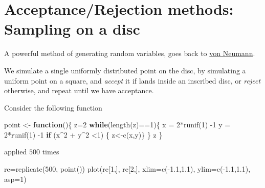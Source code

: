 \documentclass[
]{article}
\newenvironment{Shaded}{\begin{snugshade}}{\end{snugshade}}
\newcommand{\AttributeTok}[1]{\textcolor[rgb]{0.77,0.63,0.00}{#1}}
\newcommand{\ControlFlowTok}[1]{\textcolor[rgb]{0.13,0.29,0.53}{\textbf{#1}}}
\newcommand{\DecValTok}[1]{\textcolor[rgb]{0.00,0.00,0.81}{#1}}
\newcommand{\FloatTok}[1]{\textcolor[rgb]{0.00,0.00,0.81}{#1}}
\newcommand{\FunctionTok}[1]{\textcolor[rgb]{0.00,0.00,0.00}{#1}}
\newcommand{\NormalTok}[1]{#1}
\newcommand{\OtherTok}[1]{\textcolor[rgb]{0.56,0.35,0.01}{#1}}
\newcommand{\SpecialCharTok}[1]{\textcolor[rgb]{0.00,0.00,0.00}{#1}}
\theoremstyle{definition}
\theoremstyle{definition}
\theoremstyle{definition}
\theoremstyle{definition}
\theoremstyle{remark}
\begin{document}
\hypertarget{acceptancerejection-methods-sampling-on-a-disc}{%
\section{Acceptance/Rejection methods: Sampling on a disc}\label{acceptancerejection-methods-sampling-on-a-disc}}

A powerful method of generating random variables, goes back to \href{https://mcnp.lanl.gov/pdf_files/nbs_vonneumann.pdf}{von Neumann}.

We simulate a single uniformly distributed point on the disc, by simulating a uniform point on a square, and \emph{accept} it if lands inside an inscribed disc, or \emph{reject} otherwise, and repeat until we have acceptance.

Consider the following function

\begin{Shaded}
\begin{Highlighting}[]
\NormalTok{point }\OtherTok{\textless{}{-}} \ControlFlowTok{function}\NormalTok{()\{}
\NormalTok{  z}\OtherTok{=}\DecValTok{2}
  \ControlFlowTok{while}\NormalTok{(}\FunctionTok{length}\NormalTok{(z)}\SpecialCharTok{==}\DecValTok{1}\NormalTok{)\{}
\NormalTok{  x }\OtherTok{=} \DecValTok{2}\SpecialCharTok{*}\FunctionTok{runif}\NormalTok{(}\DecValTok{1}\NormalTok{) }\SpecialCharTok{{-}}\DecValTok{1}
\NormalTok{  y }\OtherTok{=} \DecValTok{2}\SpecialCharTok{*}\FunctionTok{runif}\NormalTok{(}\DecValTok{1}\NormalTok{) }\SpecialCharTok{{-}}\DecValTok{1}
\ControlFlowTok{if}\NormalTok{ (x}\SpecialCharTok{\^{}}\DecValTok{2} \SpecialCharTok{+}\NormalTok{ y}\SpecialCharTok{\^{}}\DecValTok{2} \SpecialCharTok{\textless{}}\DecValTok{1}\NormalTok{) \{ z}\OtherTok{\textless{}{-}}\FunctionTok{c}\NormalTok{(x,y)\}}
\NormalTok{  \}}
\NormalTok{  z}
\NormalTok{\}}
\end{Highlighting}
\end{Shaded}

applied \(500\) times

\begin{Shaded}
\begin{Highlighting}[]
\NormalTok{ re}\OtherTok{=}\FunctionTok{replicate}\NormalTok{(}\DecValTok{500}\NormalTok{, }\FunctionTok{point}\NormalTok{())}
 \FunctionTok{plot}\NormalTok{(re[}\DecValTok{1}\NormalTok{,], re[}\DecValTok{2}\NormalTok{,], }\AttributeTok{xlim=}\FunctionTok{c}\NormalTok{(}\SpecialCharTok{{-}}\FloatTok{1.1}\NormalTok{,}\FloatTok{1.1}\NormalTok{), }\AttributeTok{ylim=}\FunctionTok{c}\NormalTok{(}\SpecialCharTok{{-}}\FloatTok{1.1}\NormalTok{,}\FloatTok{1.1}\NormalTok{), }\AttributeTok{asp=}\DecValTok{1}\NormalTok{)}
\end{Highlighting}
\end{Shaded}
\end{document}
